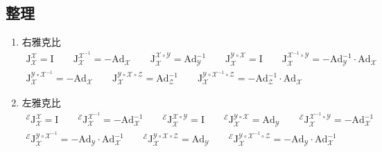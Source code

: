 \documentclass[12pt, onecolumn]{article}
\newcommand\normf{\fangsong}
\newcommand\bsm[1]{\boldsymbol{\mathrm{#1}}}
\begin{document}
	\subsection{\normf 整理}
	\begin{enumerate}
	\item 右雅克比
	\begin{equation}
	\begin{gathered}
	\bsm{J}_{\mathcal{X}}^{\mathcal{X}}=\bsm{I}
	\qquad
	\bsm{J}_{\mathcal{X}}^{\mathcal{X}^{-1}}=-\bsm{Ad}_{\mathcal{X}}
	\qquad
	\bsm{J}_{\mathcal{X}}^{\mathcal{X}\circ\mathcal{Y}}=\bsm{Ad}_{\mathcal{Y}}^{-1}
	\qquad
	\bsm{J}_{\mathcal{X}}^{\mathcal{Y}\circ\mathcal{X}}=\bsm{I}
	\qquad
	\bsm{J}_{\mathcal{X}}^{\mathcal{X}^{-1}\circ\mathcal{Y}}=-\bsm{Ad}_{\mathcal{Y}}^{-1}\cdot\bsm{Ad}_{\mathcal{X}}
	\\
	\bsm{J}_{\mathcal{X}}^{\mathcal{Y}\circ\mathcal{X}^{-1}}=-\bsm{Ad}_{\mathcal{X}}
	\qquad
	\bsm{J}_{\mathcal{X}}^{\mathcal{Y}\circ\mathcal{X}\circ\mathcal{Z}}=\bsm{Ad}_{\mathcal{Z}}^{-1}
	\qquad
	\bsm{J}_{\mathcal{X}}^{\mathcal{Y}\circ\mathcal{X}^{-1}\circ\mathcal{Z}}=
	-\bsm{Ad}_{\mathcal{Z}}^{-1}\cdot\bsm{Ad}_{\mathcal{X}}
	\end{gathered}
	\end{equation}

	\item 左雅克比
	\begin{equation}
	\begin{gathered}
	^\mathcal{E}\bsm{J}_{\mathcal{X}}^{\mathcal{X}}=\bsm{I}
	\qquad
	^\mathcal{E}\bsm{J}_{\mathcal{X}}^{\mathcal{X}^{-1}}=-\bsm{Ad}_{\mathcal{X}}^{-1}
	\qquad
	^\mathcal{E}\bsm{J}_{\mathcal{X}}^{\mathcal{X}\circ\mathcal{Y}}=\bsm{I}
	\qquad
	^\mathcal{E}\bsm{J}_{\mathcal{X}}^{\mathcal{Y}\circ\mathcal{X}}=\bsm{Ad}_{\mathcal{Y}}
	\qquad
	^\mathcal{E}\bsm{J}_{\mathcal{X}}^{\mathcal{X}^{-1}\circ\mathcal{Y}}=-\bsm{Ad}_{\mathcal{X}}^{-1}
	\\
	^\mathcal{E}\bsm{J}_{\mathcal{X}}^{\mathcal{Y}\circ\mathcal{X}^{-1}}=-\bsm{Ad}_{\mathcal{Y}}\cdot\bsm{Ad}_{\mathcal{X}}^{-1}
	\qquad
	^\mathcal{E}\bsm{J}_{\mathcal{X}}^{\mathcal{Y}\circ\mathcal{X}\circ\mathcal{Z}}=\bsm{Ad}_{\mathcal{Y}}
	\qquad
	^\mathcal{E}\bsm{J}_{\mathcal{X}}^{\mathcal{Y}\circ\mathcal{X}^{-1}\circ\mathcal{Z}}=-\bsm{Ad}_{\mathcal{Y}}\cdot\bsm{Ad}_{\mathcal{X}}^{-1}
	\end{gathered}
	\end{equation}
	\end{enumerate}
	
\end{document}
